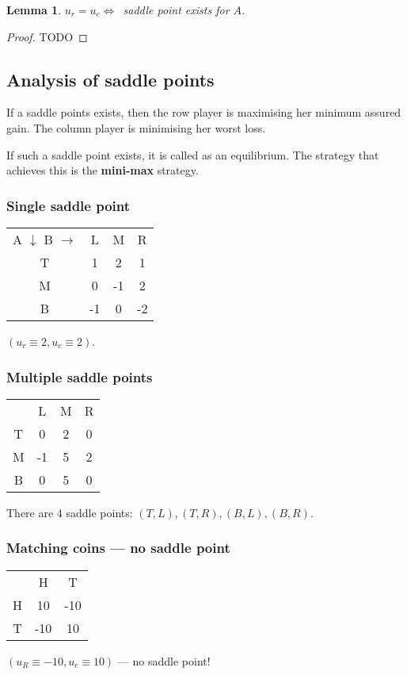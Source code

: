\documentclass[11pt]{book}
\newtheorem{lemma}[corollary]{Lemma}
\newtheorem{proof}[corollary]{Proof}
\begin{document}
\begin{lemma}
    $u_r = u_c \iff $~saddle point exists for $A$.
\end{lemma}
\begin{proof} TODO \end{proof}

\subsection{Analysis of saddle points}
If a saddle points exists, then the row player is maximising her minimum
assured gain. The column player is minimising her worst loss. 

If such a saddle point exists, it is called as an equilibrium. The strategy 
that achieves this is the \textbf{mini-max} strategy.

\subsubsection{Single saddle point}

\begin{tabular}{cccc}
    \footnotesize{A $\downarrow$ B $\rightarrow$} & L & M & R \\
    T & 1 & 2 & 1 \\
    M & 0 & -1 & 2 \\
    B & -1 & 0 & -2 \\
\end{tabular}
$(u_r \equiv 2, u_c \equiv 2)$.

\subsubsection{Multiple saddle points}

\begin{tabular}{cccc}
    & L & M & R \\
    T & 0 & 2 & 0 \\
    M & -1 & 5 & 2 \\
    B & 0 & 5 & 0 \\
\end{tabular}
There are 4 saddle points: $(T, L), (T, R), (B, L), (B, R)$.


\subsubsection{Matching coins --- no saddle point}

\begin{tabular}{ccc}
      & H & T \\
    H & 10 & -10 \\
    T & -10 & 10
\end{tabular}
$(u_R \equiv -10, u_c \equiv 10)$ --- no saddle point!
\end{document}

